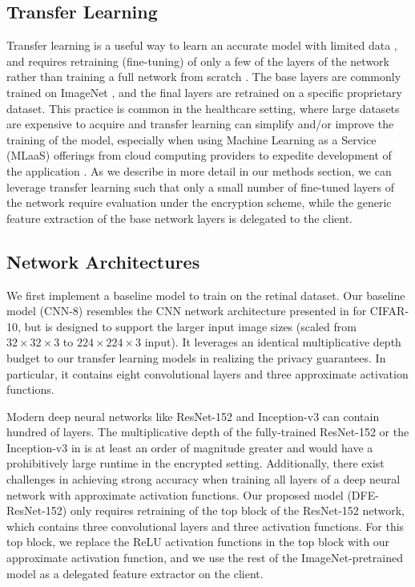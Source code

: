\documentclass[conference]{IEEEtran}
\begin{document}
\subsection{Transfer Learning}
Transfer learning is a useful way to learn an accurate model with limited data \cite{bengio2012deep}, and requires retraining (fine-tuning) of only a few of the layers of the network rather than training a full network from scratch \cite{hinton2006reducing}. The base layers are commonly trained on ImageNet \cite{deng2009imagenet, russakovsky2015imagenet}, and the final layers are retrained on a specific proprietary dataset. This practice is common in the healthcare setting, where large datasets are expensive to acquire and transfer learning can simplify and/or improve the training of the model, especially when using Machine Learning as a Service (MLaaS) offerings from cloud computing providers to expedite development of the application \cite{tajbakhsh2016convolutional, greenspan2016guest}. As we describe in more detail in our methods section, we can leverage transfer learning such that only a small number of fine-tuned layers of the network require evaluation under the encryption scheme, while the generic feature extraction of the base network layers is delegated to the client.

\subsection{Network Architectures}
We first implement a baseline model to train on the retinal dataset. Our baseline model (CNN-8) resembles the CNN network architecture presented in \cite{hesamifard2017cryptodl} for CIFAR-10, but is designed to support the larger input image sizes (scaled from $32\times32\times3$ to $224\times224\times3$ input). It leverages an identical multiplicative depth budget to our transfer learning models in realizing the privacy guarantees. In particular, it contains eight convolutional layers and three approximate activation functions. 

Modern deep neural networks like ResNet-152 \cite{he2015resnet} and Inception-v3 \cite{szegedy2015inception} can contain hundred of layers. The multiplicative depth of the fully-trained ResNet-152 or the Inception-v3 in \cite{gulshan2016development} is at least an order of magnitude greater and would have a prohibitively large runtime in the encrypted setting. Additionally, there exist challenges in achieving strong accuracy when training all layers of a deep neural network with approximate activation functions. Our proposed model (DFE-ResNet-152) only requires retraining of the top block of the ResNet-152 network, which contains three convolutional layers and three activation functions.  For this top block, we replace the ReLU activation functions in the top block with our approximate activation function, and we use the rest of the ImageNet-pretrained model as a delegated feature extractor on the client.
\end{document}
